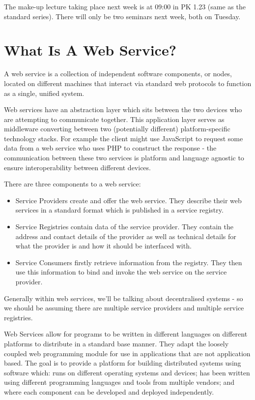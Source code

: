 
The make-up lecture taking place next week is at 09:00 in PK 1.23 (same as the standard series). There will only be two seminars next week, both on Tuesday. 

\section{What Is A Web Service?}
A web service is a collection of independent software components, or nodes, located on different machines that interact via standard web protocols to function as a single, unified system. 

Web services have an abstraction layer which sits between the two devices who are attempting to communicate together. This application layer serves as middleware converting between two (potentially different) platform-specific technology stacks. For example the client might use JavaScript to request some data from a web service who uses PHP to construct the response - the communication between these two services is platform and language agnostic to ensure interoperability between different devices. 

There are three components to a web service:
\begin{itemize}
    \item Service Providers create and offer the web service. They describe their web services in a standard format which is published in a service registry.
    \item Service Registries contain data of the service provider. They contain the address and contact details of the provider as well as technical details for what the provider is and how it should be interfaced with.
    \item Service Consumers firstly retrieve information from the registry. They then use this information to bind and invoke the web service on the service provider. 
\end{itemize}

Generally within web services, we'll be talking about decentralised systems - so we should be assuming there are multiple service providers and multiple service registries.

Web Services allow for programs to be written in different languages on different platforms to distribute in a standard base manner. They adapt the loosely coupled web programming module for use in applications that are not application based. The goal is to provide a platform for building distributed systems using software which: runs on different operating systems and devices; has been written using different programming languages and tools from multiple vendors; and where each component can be developed and deployed independently. 

